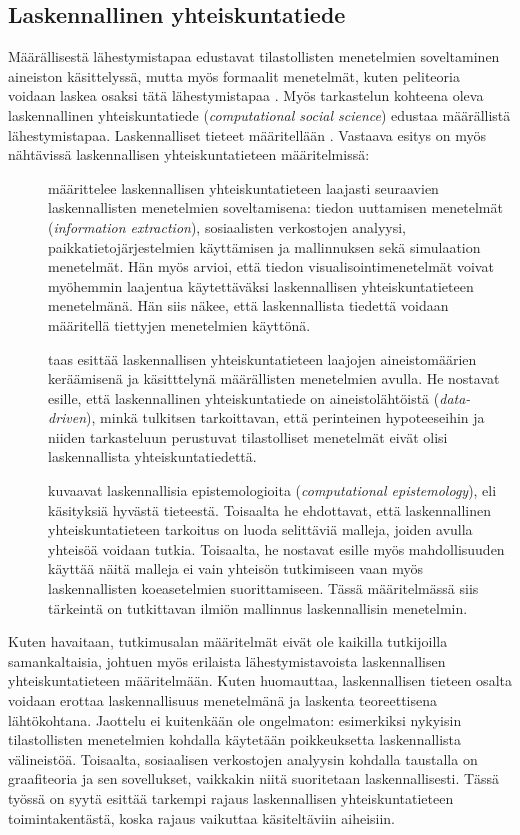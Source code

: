 \documentclass[finnish,gradu,twoside,12pt]{tktltiki}
\begin{document}
\subsection{Laskennallinen yhteiskuntatiede}

Määrällisestä lähestymistapaa edustavat tilastollisten menetelmien soveltaminen aineiston käsittelyssä, mutta myös formaalit menetelmät, kuten peliteoria voidaan laskea osaksi tätä lähestymistapaa \citep{a}. Myös tarkastelun kohteena oleva laskennallinen yhteiskuntatiede (\textit{computational social science}) edustaa määrällistä lähestymistapaa. Laskennalliset tieteet määritellään \citep{a,b,c}. Vastaava esitys on myös nähtävissä laskennallisen yhteiskuntatieteen määritelmissä:

\begin{description}
\item[\citet{cioffi-revilla10}] määrittelee laskennallisen yhteiskuntatieteen laajasti seuraavien laskennallisten menetelmien soveltamisena: tiedon uuttamisen menetelmät (\textit{information extraction}), sosiaalisten verkostojen analyysi, paikkatietojärjestelmien käyttämisen ja mallinnuksen sekä simulaation menetelmät. Hän myös arvioi, että tiedon visualisointimenetelmät voivat myöhemmin laajentua käytettäväksi laskennallisen yhteiskuntatieteen menetelmänä. Hän siis näkee, että laskennallista tiedettä voidaan määritellä tiettyjen menetelmien käyttönä.
\item[\citet{lazer09}] taas esittää laskennallisen yhteiskuntatieteen laajojen aineistomäärien keräämisenä ja käsitttelynä määrällisten menetelmien avulla. He nostavat esille, että laskennallinen yhteiskuntatiede on aineistolähtöistä (\textit{data-driven}), minkä tulkitsen tarkoittavan, että perinteinen hypoteeseihin ja niiden tarkasteluun perustuvat tilastolliset menetelmät eivät olisi laskennallista yhteiskuntatiedettä.
\item[\cite{bankes02}] kuvaavat laskennallisia epistemologioita (\textit{computational epistemology}), eli käsityksiä hyvästä tieteestä. Toisaalta he ehdottavat, että laskennallinen yhteiskuntatieteen tarkoitus on luoda selittäviä malleja, joiden avulla yhteisöä voidaan tutkia. Toisaalta, he nostavat esille myös mahdollisuuden käyttää näitä malleja ei vain yhteisön tutkimiseen vaan myös laskennallisten koeasetelmien suorittamiseen. Tässä määritelmässä siis tärkeintä on tutkittavan ilmiön mallinnus laskennallisin menetelmin.
\end{description}

Kuten havaitaan, tutkimusalan määritelmät eivät ole kaikilla tutkijoilla samankaltaisia, johtuen myös erilaista lähestymistavoista laskennallisen yhteiskuntatieteen määritelmään. Kuten \citet{cioffi-revilla10} huomauttaa, laskennallisen tieteen osalta voidaan erottaa laskennallisuus menetelmänä ja laskenta teoreettisena lähtökohtana. Jaottelu ei kuitenkään ole ongelmaton: esimerkiksi nykyisin tilastollisten menetelmien kohdalla käytetään poikkeuksetta laskennallista välineistöä. Toisaalta, sosiaalisen verkostojen analyysin kohdalla taustalla on graafiteoria ja sen sovellukset, vaikkakin niitä suoritetaan laskennallisesti. Tässä työssä on syytä esittää tarkempi rajaus laskennallisen yhteiskuntatieteen toimintakentästä, koska rajaus vaikuttaa käsiteltäviin aiheisiin.
\end{document}
